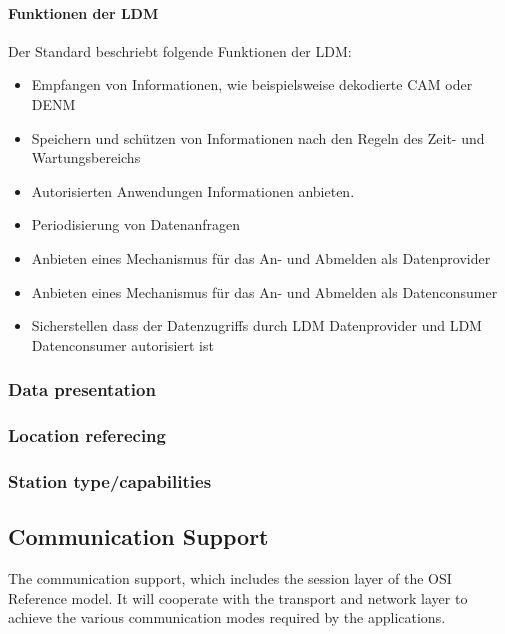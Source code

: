 \paragraph{Funktionen der LDM}
Der Standard \cite{en302895} beschriebt folgende Funktionen der \ac{LDM}:
\begin{itemize}
	\item Empfangen von Informationen, wie beispielsweise dekodierte \ac{CAM} oder \ac{DENM}
	\item Speichern und schützen  von Informationen nach den Regeln des Zeit- und Wartungsbereichs
	\item Autorisierten Anwendungen Informationen anbieten. 
	\item Periodisierung von Datenanfragen
	\item Anbieten eines Mechanismus für das An- und Abmelden als Datenprovider
	\item Anbieten eines Mechanismus für das An- und Abmelden als Datenconsumer
	\item Sicherstellen dass der Datenzugriffs durch \ac{LDM} Datenprovider und \ac{LDM} Datenconsumer autorisiert ist
\end{itemize}

\subsubsection{Data presentation}

\subsubsection{Location referecing}

\subsubsection{Station type/capabilities}

\subsection{Communication Support}
The communication support, which includes the session layer of the OSI Reference model. It will
cooperate with the transport and network layer to achieve the various communication modes required by
the applications. 

